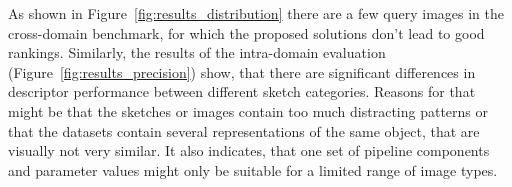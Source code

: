 As shown in Figure~\ref{fig:results_distribution} there are a few query images
in the cross-domain benchmark, for which the proposed solutions don't lead to
good rankings. Similarly, the results of the intra-domain evaluation
(Figure~\ref{fig:results_precision}) show, that there are significant
differences in descriptor performance between different sketch categories.
Reasons for that might be that the sketches or images contain too much
distracting patterns or that the datasets contain several representations of
the same object, that are visually not very similar. It also indicates, that
one set of pipeline components and parameter values might only be suitable for
a limited range of image types.
